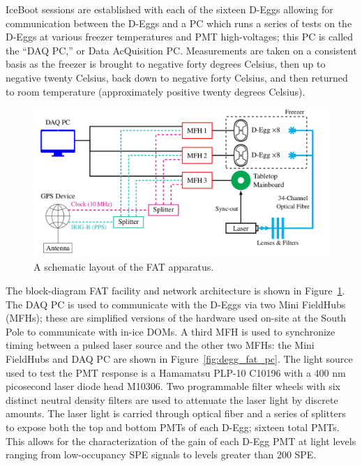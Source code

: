 \documentclass[main.tex]{subfiles}
\begin{document}
IceBoot sessions are established with each of the sixteen D-Eggs allowing for communication between the D-Eggs and a PC which runs a series of tests on the D-Eggs at various freezer temperatures and PMT high-voltages; this PC is called the ``DAQ PC,'' or Data AcQuisition PC. 
Measurements are taken on a consistent basis as the freezer is brought to negative forty degrees Celsius, then up to negative twenty Celsius, back down to negative forty Celsius, and then returned to room temperature (approximately positive twenty degrees Celsius). 

\begin{figure}
    \centering
    \includegraphics[width=\linewidth]{figures/fat_layout.png}
    \caption{A schematic layout of the FAT apparatus. }
    \label{fig:fatscheme}
\end{figure}

The block-diagram FAT facility and network architecture is shown in Figure~\ref{fig:fatscheme}. 
The DAQ PC is used to communicate with the D-Eggs via two Mini FieldHubs (MFHs); these are simplified versions of the hardware used on-site at the South Pole to communicate with in-ice DOMs. 
A third MFH is used to synchronize timing between a pulsed laser source and the other two MFHs: the Mini FieldHubs and DAQ PC are shown in Figure~\ref{fig:degg_fat_pc}.
The light source used to test the PMT response is a Hamamatsu PLP-10 C10196 with a 400 nm picosecond laser diode head M10306.
Two programmable filter wheels with six distinct neutral density filters are used to attenuate the laser light by discrete amounts. 
The laser light is carried through optical fiber and a series of splitters to expose both the top and bottom PMTs of each D-Egg; sixteen total PMTs.
This allows for the characterization of the gain of each D-Egg PMT at light levels ranging from low-occupancy SPE signals to levels greater than 200 SPE. 
\end{document}
